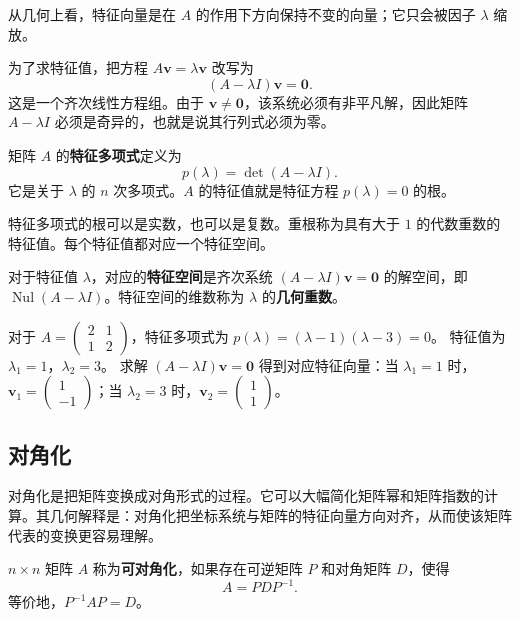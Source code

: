 从几何上看，特征向量是在 $A$ 的作用下方向保持不变的向量；它只会被因子 $\lambda$ 缩放。

为了求特征值，把方程 $A\mathbf{v}=\lambda\mathbf{v}$ 改写为
\[
(A-\lambda I)\mathbf{v}=\mathbf{0}.
\]
这是一个齐次线性方程组。由于 $\mathbf{v}\neq\mathbf{0}$，该系统必须有非平凡解，因此矩阵 $A-\lambda I$ 必须是奇异的，也就是说其行列式必须为零。

\begin{definition}[特征多项式]
矩阵 $A$ 的\textbf{特征多项式}定义为
\[
p(\lambda)=\det(A-\lambda I).
\]
它是关于 $\lambda$ 的 $n$ 次多项式。$A$ 的特征值就是特征方程 $p(\lambda)=0$ 的根。
\end{definition}

特征多项式的根可以是实数，也可以是复数。重根称为具有大于 $1$ 的代数重数的特征值。每个特征值都对应一个特征空间。

\begin{definition}[特征空间]
对于特征值 $\lambda$，对应的\textbf{特征空间}是齐次系统 $(A-\lambda I)\mathbf{v}=\mathbf{0}$ 的解空间，即 $\operatorname{Nul}(A-\lambda I)$。特征空间的维数称为 $\lambda$ 的\textbf{几何重数}。
\end{definition}

\begin{example}
对于 $A=\begin{pmatrix}2&1\\1&2\end{pmatrix}$，特征多项式为 $p(\lambda)=(\lambda-1)(\lambda-3)=0$。
特征值为 $\lambda_1=1$，$\lambda_2=3$。
求解 $(A-\lambda I)\mathbf{v}=\mathbf{0}$ 得到对应特征向量：当 $\lambda_1=1$ 时，$\mathbf{v}_1=\begin{pmatrix}1\\-1\end{pmatrix}$；当 $\lambda_2=3$ 时，$\mathbf{v}_2=\begin{pmatrix}1\\1\end{pmatrix}$。
\end{example}

\subsection{对角化}

对角化是把矩阵变换成对角形式的过程。它可以大幅简化矩阵幂和矩阵指数的计算。其几何解释是：对角化把坐标系统与矩阵的特征向量方向对齐，从而使该矩阵代表的变换更容易理解。

\begin{definition}[可对角化矩阵]
$n\times n$ 矩阵 $A$ 称为\textbf{可对角化}，如果存在可逆矩阵 $P$ 和对角矩阵 $D$，使得
\[
A=PDP^{-1}.
\]
等价地，$P^{-1}AP=D$。
\end{definition}

